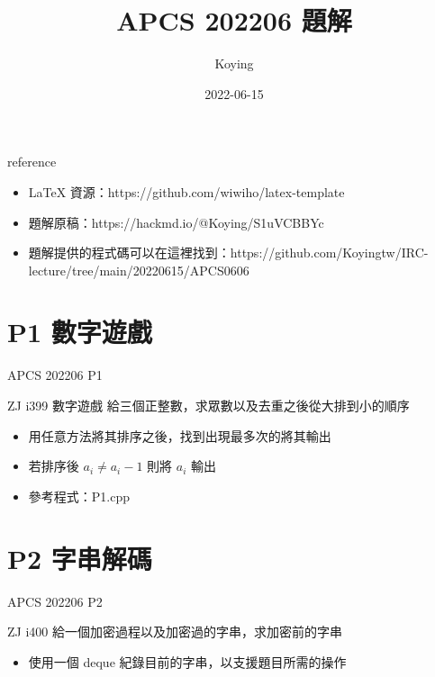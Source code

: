 \documentclass[aspectratio=169]{beamer}
\title{APCS 202206 題解}
\author{Koying}
\date{2022-06-15}
\begin{document}
    \begin{frame}
        \titlepage
    \end{frame}
    
    \begin{frame}{reference}
    		\begin{itemize}
    			\item LaTeX 資源：https://github.com/wiwiho/latex-template
    			\item 題解原稿：https://hackmd.io/@Koying/S1uVCBBYc
    			\item 題解提供的程式碼可以在這裡找到：https://github.com/Koyingtw/IRC-lecture/tree/main/20220615/APCS0606
    		\end{itemize}
    \end{frame}
    
	\section{P1 數字遊戲}    
    
    \begin{frame}{APCS 202206 P1}
    		\begin{block}{ZJ i399 數字遊戲}
    			給三個正整數，求眾數以及去重之後從大排到小的順序
    		\end{block}
		
		\begin{itemize}
			\item 用任意方法將其排序之後，找到出現最多次的將其輸出
			\item 若排序後 $a_i \neq a_i-1$ 則將 $a_i$ 輸出
			\item 參考程式：P1.cpp
		\end{itemize}		    		
    		
    \end{frame}
    
	\section{P2 字串解碼}    
    
    \begin{frame}{APCS 202206 P2}
    		\begin{block}{ZJ i400}
    			給一個加密過程以及加密過的字串，求加密前的字串
    		\end{block}
    		
    		\begin{itemize}
    			\item 使用一個 deque 紀錄目前的字串，以支援題目所需的操作
    		\end{itemize}
    \end{frame}
    
\end{document}
